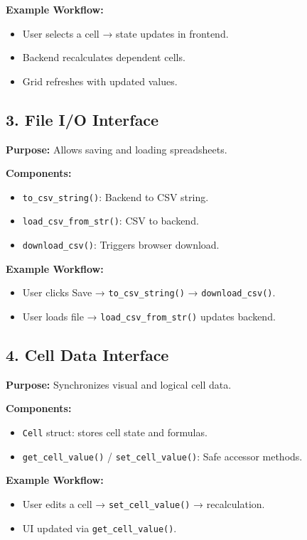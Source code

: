 \documentclass{article}
\begin{document}
\textbf{Example Workflow:}
\begin{itemize}
    \item User selects a cell → state updates in frontend.
    \item Backend recalculates dependent cells.
    \item Grid refreshes with updated values.
\end{itemize}

\subsection*{3. File I/O Interface}
\textbf{Purpose:} Allows saving and loading spreadsheets.

\textbf{Components:}
\begin{itemize}
    \item \texttt{to\_csv\_string()}: Backend to CSV string.
    \item \texttt{load\_csv\_from\_str()}: CSV to backend.
    \item \texttt{download\_csv()}: Triggers browser download.
\end{itemize}

\textbf{Example Workflow:}
\begin{itemize}
    \item User clicks Save → \texttt{to\_csv\_string()} → \texttt{download\_csv()}.
    \item User loads file → \texttt{load\_csv\_from\_str()} updates backend.
\end{itemize}

\subsection*{4. Cell Data Interface}
\textbf{Purpose:} Synchronizes visual and logical cell data.

\textbf{Components:}
\begin{itemize}
    \item \texttt{Cell} struct: stores cell state and formulas.
    \item \texttt{get\_cell\_value()} / \texttt{set\_cell\_value()}: Safe accessor methods.
\end{itemize}

\textbf{Example Workflow:}
\begin{itemize}
    \item User edits a cell → \texttt{set\_cell\_value()} → recalculation.
    \item UI updated via \texttt{get\_cell\_value()}.
\end{itemize}
\end{document}
